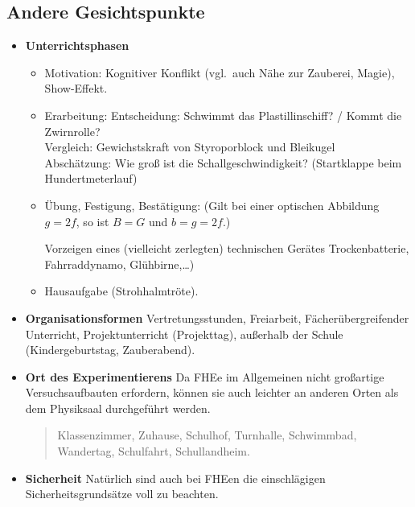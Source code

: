 \subsection{Andere Gesichtspunkte}
\begin{itemize}

	\item
	{\bf Unterrichtsphasen}
	\begin{itemize}
		\item
		Motivation:
		Kognitiver Konflikt (vgl.\ auch N\"{a}he zur Zauberei, Magie),
		Show-Effekt.
		\item
		Erarbeitung:
		Entscheidung: Schwimmt das Plastillinschiff? /
		Kommt die Zwirnrolle? \\
		Vergleich: Gewichstskraft von Styroporblock und Bleikugel \\
		Absch\"{a}tzung: Wie gro{\ss} ist die Schallgeschwindigkeit?
		(Startklappe beim Hundertmeterlauf)
		\item
		\"{U}bung, Festigung, Best\"{a}tigung:
		(Gilt bei einer optischen Abbildung
		$g = 2f$, so ist $B=G$ und $b = g = 2f$.)
		
		Vorzeigen eines (vielleicht zerlegten) technischen Ger\"{a}tes
		Trockenbatterie, Fahrraddynamo, Gl\"{u}hbirne,\dots)
		
		\item
		Hausaufgabe (Strohhalmtr\"{o}te).
	\end{itemize}
	
	\item
	{\bf Organisationsformen}
	Vertretungsstunden, Freiarbeit, F\"{a}cher\"{u}bergreifender Unterricht,
	Projektunterricht (Projekttag),
	au{\ss}erhalb der Schule (Kindergeburtstag, Zauberabend).
	
	\item
	{\bf Ort des Experimentierens}
	Da FHEe im Allgemeinen nicht gro{\ss}artige Versuchsaufbauten
	erfordern, k\"{o}nnen sie auch leichter an anderen Orten
	als dem Physiksaal durchgef\"{u}hrt werden.
	
	\begin{quote}
		Klassenzimmer, Zuhause, Schulhof, Turnhalle,
		Schwimmbad, Wandertag, Schulfahrt, Schul\-land\-heim.
	\end{quote}
	
	\item
	{\bf Sicherheit}
	Nat\"{u}rlich sind auch bei FHEen die
	einschl\"{a}gigen Sicherheitsgrunds\"{a}tze voll zu beachten.
	

\end{itemize}
